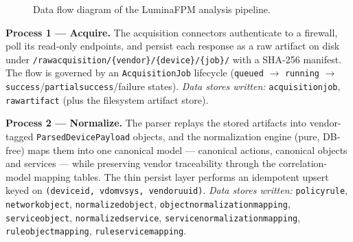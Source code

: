 \documentclass[12pt,a4paper]{report}
\renewcommand{\_}{\textunderscore\allowbreak}
\begin{document}
\begin{figure}[htbp]
\centering
{}
\caption{Data flow diagram of the LuminaFPM analysis pipeline.}
\label{fig:dfd}
\end{figure}

\textbf{Process 1 --- Acquire.} The acquisition connectors authenticate to a firewall, poll its read-only endpoints, and persist each response as a raw artifact on disk under \texttt{/raw\_acquisition/\{vendor\}/\{device\}/\{job\}/} with a SHA-256 manifest. The flow is governed by an \texttt{AcquisitionJob} lifecycle (\texttt{queued} $\rightarrow$ \texttt{running} $\rightarrow$ \texttt{success}/\texttt{partial\_success}/failure states). \textit{Data stores written:} \texttt{acquisition\_job}, \texttt{raw\_artifact} (plus the filesystem artifact store).

\textbf{Process 2 --- Normalize.} The parser replays the stored artifacts into vendor-tagged \texttt{ParsedDevicePayload} objects, and the normalization engine (pure, DB-free) maps them into one canonical model --- canonical actions, canonical objects and services --- while preserving vendor traceability through the correlation-model mapping tables. The thin persist layer performs an idempotent upsert keyed on \texttt{(device\_id, vdom\_vsys, vendor\_uuid)}. \textit{Data stores written:} \texttt{policy\_rule}, \texttt{network\_object}, \texttt{normalized\_object}, \texttt{object\_normalization\_mapping}, \texttt{service\_object}, \texttt{normalized\_service}, \texttt{service\_normalization\_mapping}, \texttt{rule\_object\_mapping}, \texttt{rule\_service\_mapping}.
\end{document}
